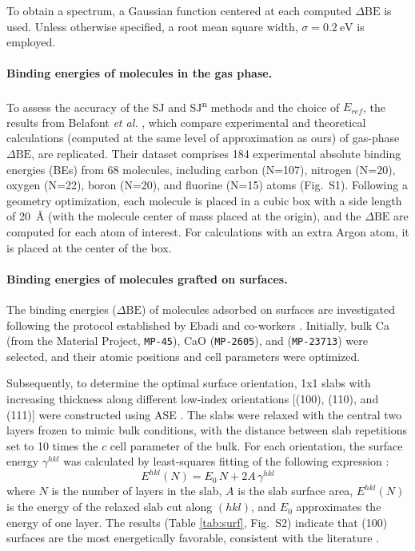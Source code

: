 \documentclass[journal=jpccck,manuscript=article]{achemso}
\def\dbe{\ensuremath{\Delta\text{BE}}}
\begin{document}
To obtain a spectrum, a Gaussian function centered at each computed \dbe{} is used. Unless otherwise specified, a root mean square width, $\sigma = \SI{0.2}{\electronvolt}$ is employed.

\paragraph{Binding energies of molecules in the gas phase.}
To assess the accuracy of the SJ and SJ\textsuperscript{n} methods and the choice of $E_{ref}$, the results from Belafont \textit{et al.} \cite{pueyobellafontPredictingCoreLevel2017}, which compare experimental and theoretical calculations (computed at the same level of approximation as ours) of gas-phase \dbe, are replicated. Their dataset comprises 184 experimental absolute binding energies (BEs) from 68 molecules, including carbon (N=107), nitrogen (N=20), oxygen (N=22), boron (N=20), and fluorine (N=15) atoms (Fig.~S1). Following a geometry optimization, each molecule is placed in a cubic box with a side length of \SI{20}{\angstrom} (with the molecule center of mass placed at the origin), and the \dbe{} are computed for each atom of interest. For calculations with an extra Argon atom, it is placed at the center of the box.

\paragraph{Binding energies of molecules grafted on surfaces.} The binding energies (\dbe{}) of molecules adsorbed on surfaces are investigated following the protocol established by Ebadi and co-workers \cite{ebadiInsightsLiMetalOrganic2019}. Initially, bulk Ca (from the Material Project, \texttt{MP-45}), CaO (\texttt{MP-2605}), and  (\texttt{MP-23713}) were selected, and their atomic positions and cell parameters were optimized.

Subsequently, to determine the optimal surface orientation, 1x1 slabs with increasing thickness along different low-index orientations [(100), (110), and (111)] were constructed using ASE \cite{larsenAtomicSimulationEnvironment2017}. The slabs were relaxed with the central two layers frozen to mimic bulk conditions, with the distance between slab repetitions set to 10 times the $c$ cell parameter of the bulk. For each orientation, the surface energy $\gamma^{hkl}$ was calculated by least-squares fitting of the following expression \cite{sunEfficientCreationConvergence2013,tranSurfaceEnergiesElemental2016}:
\begin{equation}
	E^{hkl}(N) = E_0\,N + 2A\,\gamma^{hkl} \label{eq:surf}
\end{equation}
where $N$ is the number of layers in the slab, $A$ is the slab surface area, $E^{hkl}(N)$ is the energy of the relaxed slab cut along $(hkl)$, and $E_0$ approximates the energy of one layer. The results (Table \ref{tab:surf}, Fig.~S2) indicate that (100) surfaces are the most energetically favorable, consistent with the literature \cite{deleeuwDensityFunctionalTheory2000,ebadiInsightsLiMetalOrganic2019}.
\end{document}
